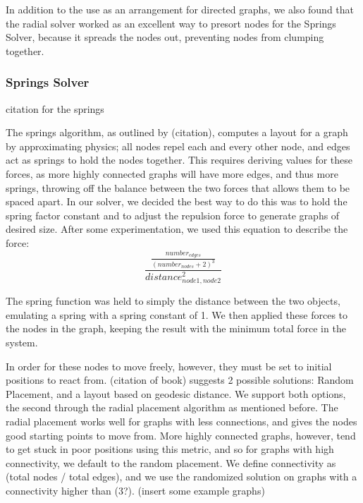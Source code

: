 \documentclass{article}
\begin{document}

In addition to the use as an arrangement for directed graphs, we also found that the radial solver worked as an excellent way to presort nodes for the Springs Solver, because it spreads the nodes out, preventing nodes from clumping together.


\subsubsection{Springs Solver}
citation for the springs\cite{springs}


The springs algorithm, as outlined by (citation), computes a layout for a graph by approximating physics; all nodes repel each and every other node, 
and edges act as springs to hold the nodes together. This requires deriving values for these forces, as more highly connected graphs will have 
more edges, and thus more springs, throwing off the balance between the two forces that allows them to be spaced apart. In our solver, we decided
the best way to do this was to hold the spring factor constant and to adjust the repulsion force to generate graphs of desired size. After some 
experimentation, we used this equation to describe the force: 
$$ \frac{\frac{number_{edges}}{(number_{nodes}+2)^{3}}}{distance_{node1, node2}^2} $$


The spring function was held to simply the distance between the two objects, emulating a spring with a spring constant of 1. We then applied these forces
to the nodes in the graph, keeping the result with the minimum total force in the system.

In order for these nodes to move freely, however, they must be set to initial positions to react from. (citation of book) suggests 2 possible solutions: 
Random Placement, and a layout based on geodesic distance. We support both options, the second through the radial placement algorithm as mentioned before.
The radial placement works well for graphs with less connections, and gives the nodes good starting points to move from. More highly connected graphs,
however, tend to get stuck in poor positions using this metric, and so for graphs with high connectivity, we default to the random placement. We define 
connectivity as (total nodes / total edges), and we use the randomized solution on graphs with a connectivity higher than (3?).
(insert some example graphs)
\end{document}
